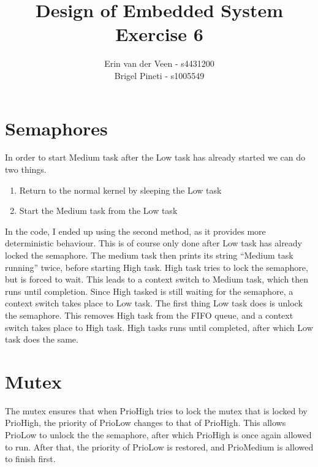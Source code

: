 \documentclass{scrartcl}
\title{Design of Embedded System\\Exercise 6}
\author{Erin van der Veen - s4431200\\
	Brigel Pineti - s1005549}
\begin{document}
\maketitle

\section*{Semaphores}
In order to start Medium task after the Low task has already started we can do two things.
\begin{enumerate}
	\item Return to the normal kernel by sleeping the Low task
	\item Start the Medium task from the Low task
\end{enumerate}
In the code, I ended up using the second method, as it provides more deterministic behaviour.
This is of course only done after Low task has already locked the semaphore.
The medium task then prints its string ``Medium task running'' twice, before starting High task.
High task tries to lock the semaphore, but is forced to wait.
This leads to a context switch to Medium task, which then runs until completion.
Since High tasked is still waiting for the semaphore, a context switch takes place to Low task.
The first thing Low task does is unlock the semaphore.
This removes High task from the FIFO queue, and a context switch takes place to High task.
High tasks runs until completed, after which Low task does the same.

\section*{Mutex}
The mutex ensures that when PrioHigh tries to lock the mutex that is locked by PrioHigh, the priority of PrioLow changes to that of PrioHigh.
This allows PrioLow to unlock the the semaphore, after which PrioHigh is once again allowed to run.
After that, the priority of PrioLow is restored, and PrioMedium is allowed to finish first.
\end{document}

